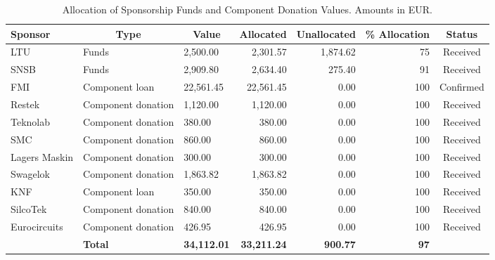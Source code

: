 \begin{table}[H]
\centering
\begin{tabular}{l|m{}|l|r|r|r|c}
\hline
\multicolumn{1}{|l|}{\textbf{Sponsor}} & \multicolumn{1}{|c|}{\textbf{Type}} & \multicolumn{1}{c|}{\textbf{Value}} & \multicolumn{1}{c|}{\textbf{Allocated}} & \multicolumn{1}{c|}{\textbf{Unallocated}} & \multicolumn{1}{c|}{\textbf{\% Allocation}} & \multicolumn{1}{c|}{\textbf{Status}} \\ \hline
\multicolumn{1}{|l|}{LTU} & Funds & 2,500.00 & 2,301.57 & 1,874.62 & 75 & \multicolumn{1}{c|}{Received} \\ \hline
\multicolumn{1}{|l|}{SNSB} & Funds & 2,909.80 & 2,634.40 & 275.40 & 91 & \multicolumn{1}{c|}{Received} \\ \hline
\multicolumn{1}{|l|}{FMI} & Component loan & 22,561.45 & 22,561.45 & 0.00 & 100 & \multicolumn{1}{c|}{Confirmed} \\ \hline
\multicolumn{1}{|l|}{Restek} & Component donation & 1,120.00 & 1,120.00 & 0.00 & 100 & \multicolumn{1}{c|}{Received} \\ \hline
\multicolumn{1}{|l|}{Teknolab} & Component donation & 380.00 & 380.00 & 0.00 & 100 & \multicolumn{1}{c|}{Received} \\ \hline
\multicolumn{1}{|l|}{SMC} & Component donation & 860.00 & 860.00 & 0.00 & 100 & \multicolumn{1}{c|}{Received} \\ \hline
\multicolumn{1}{|l|}{Lagers Maskin} & Component donation & 300.00 & 300.00 & 0.00 & 100 & \multicolumn{1}{c|}{Received} \\ \hline
\multicolumn{1}{|l|}{Swagelok} & Component donation & 1,863.82 & 1,863.82 & 0.00 & 100 & \multicolumn{1}{c|}{Received} \\ \hline
\multicolumn{1}{|l|}{KNF} & Component loan & 350.00 & 350.00 & 0.00 & 100 & \multicolumn{1}{c|}{Received} \\ \hline
\multicolumn{1}{|l|}{SilcoTek} & Component donation & 840.00 & 840.00 & 0.00 & 100 & \multicolumn{1}{c|}{Received} \\ \hline
\multicolumn{1}{|l|}{Eurocircuits} & Component donation & 426.95 & 426.95 & 0.00 & 100 & \multicolumn{1}{c|}{Received} \\ \hline
 & \multicolumn{1}{l|}{\textbf{Total}} & \textbf{34,112.01} & \textbf{33,211.24} & \textbf{900.77} & \textbf{97} & \multicolumn{1}{l}{} \\ \cline{2-6}
\end{tabular}
\caption{Allocation of Sponsorship Funds and Component Donation Values. Amounts in EUR.}
\label{table:sponsroship-allocation}
\end{table} 